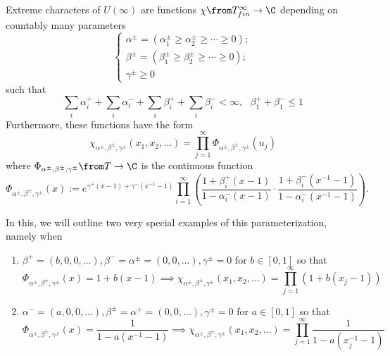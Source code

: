 \documentclass[11pt,leqno,oneside]{amsart}
\numberwithin{thm}{section}
\newcommand{\T}{T} %
\begin{document}
\begin{thm}
  Extreme characters of \(U(\infty)\) are functions \(\chi \from
  T^\infty_{fin} \to \C\) depending on countably many parameters \[
    \begin{cases}
      \alpha^{\pm} = (\alpha_1^\pm \geq \alpha_2^\pm \geq \cdots \geq
      0); \\
      \beta^\pm = (\beta_1^\pm \geq \beta_2^\pm \geq \cdots \geq 0);
      \\
      \gamma^\pm \geq 0
    \end{cases}
  \]
  such that \[
    \sum_i \alpha_i^+ + \sum_i \alpha_i^- + \sum_i \beta_i^+ + \sum_i
    \beta_i^- < \infty, \ \ \ \beta_1^+ + \beta_1^- \leq 1
  \]
  Furthermore, these functions have the form \[
    \chi_{\alpha^\pm, \beta^\pm, \gamma^\pm}(x_1, x_2, \ldots) =
    \prod_{j=1}^\infty \Phi_{\alpha^\pm, \beta^\pm, \gamma^\pm}(u_j)
  \]
  where \(\Phi_{\alpha^\pm, \beta^\pm, \gamma^\pm} \from \T \to \C\)
  is the continuous function \[
    \Phi_{\alpha^\pm ,\beta^\pm, \gamma^\pm}(x) :=
    e^{\gamma^+(x-1)+\gamma^-(x^{-1}-1)} \prod_{i=1}^\infty \left(
      \frac{1+\beta_i^+(x-1)}{1-\alpha_i^{-} (x-1)} \cdot
      \frac{1+\beta_i^-(x^{-1}-1)}{1-\alpha_i^-(x^{-1}-1)}\right).
  \]
\end{thm}
In this, we will outline two very special examples of this
parameterization, namely when
\begin{enumerate}
\item \(\beta^+ = (b,0,0,\ldots), \beta^- = \alpha^\pm = (0,0,\ldots),
  \gamma^\pm = 0\) for \(b \in [0,1]\) so that \[
    \Phi_{\alpha^\pm ,\beta^\pm, \gamma^\pm}(x) = 1+b(x-1) \implies
    \chi_{\alpha^\pm, \beta^\pm, \gamma^\pm}(x_1, x_2, \ldots) =
    \prod_{j=1}^\infty (1+b(x_j-1))
  \]
\item \(\alpha^- = (a,0,0,\ldots), \beta^\pm = \alpha^+ = (0,0,\ldots),
  \gamma^\pm = 0\) for \(a \in [0,1]\) so that \[
    \Phi_{\alpha^\pm ,\beta^\pm, \gamma^\pm}(x) =
    \frac{1}{1-a(x^{-1}-1)} \implies
    \chi_{\alpha^\pm, \beta^\pm, \gamma^\pm}(x_1, x_2, \ldots) =
    \prod_{j=1}^\infty \frac{1}{1-a(x_j^{-1}-1)}
  \]
\end{enumerate}
\end{document}
